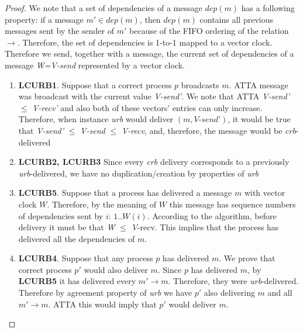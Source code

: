 \documentclass[a4paper]{article}
\begin{document}
\begin{proof}
We note that a set of dependencies of a message $dep(m)$ has a following property: if a message $m'\in dep(m)$, then $dep(m)$ contains all previous messages sent by the sender of $m'$ because of the FIFO ordering of the relation $\to$. Therefore, the set of dependencies is 1-to-1 mapped to a vector clock.
Therefore we send, together with a message, the current set of dependencies of a message {\it W=V-send} represented by a vector clock.
\begin{enumerate}
	\item {\bf LCURB1}. Suppose that a correct process $p$ broadcasts $m$. ATTA message was broadcast with the current value {\it V-send'}. We note that ATTA {\it V-send'} $\leq$ {\it V-recv'} and also both of these vectors' entries can only increase. Therefore, when instance {\it urb} would deliver $(m, \textit{V-send'})$, it would be true that {\it V-send'} $\leq$ {\it V-send} $\leq$ {\it V-recv}, and, therefore, the message would be {\it crb}-delivered
	\item {\bf LCURB2, LCURB3} Since every {\it crb} delivery corresponds to a previously {\it urb}-delivered, we have no duplication/creation by properties of {\it urb}
	\item {\bf LCURB5}. Suppose that a process has delivered a message $m$ with vector clock $W$. Therefore, by the meaning of $W$ this message has sequence numbers of dependencies sent by $i$: $1..\textit{W}(i)$. According to the algorithm, before delivery it must be that {\textit W} $\leq$ {\textit V-recv}. This implies that the process has delivered all the dependencies of $m$.
	\item {\bf LCURB4}. Suppose that any process $p$ has delivered $m$. We prove that correct process $p'$ would also deliver $m$. Since $p$ has delivered $m$, by {\bf LCURB5} it has delivered every $m'\to m$. Therefore, they were {\it urb}-delivered. Therefore by agreement property of {\it urb} we have $p'$ also delivering $m$ and all $m'\to m$. ATTA this would imply that $p'$ would deliver $m$.
\end{enumerate}
\end{proof}
\end{document}
